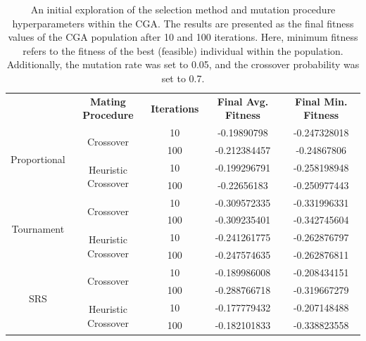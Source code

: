 \documentclass[10pt]{article}
\begin{document}
\begin{table}[H]
    \centering
    \begin{tabular}{|*{5}{c|}}
        \hline
        \renewcommand{\arraystretch}{1.5}
        \multirow{2}{*}{\textbf{Selection Method}} & \multirow{2}{*}{\textbf{Mating Procedure}} & \multirow{2}{*}{\textbf{Iterations}} & \multirow{2}{*}{\textbf{Final Avg. Fitness}} & \multirow{2}{*}{\textbf{Final Min. Fitness}} \\
        & & & & \\
        \hline
        \multirow{4}{*}{Proportional} & \multirow{2}{*}{Crossover} & 10 & -0.19890798 & -0.247328018 \\
        & &\cellcolor{lightgray} 100 &\cellcolor{lightgray} -0.212384457 &\cellcolor{lightgray} -0.24867806 \\
        \cline{2-5}
        & \multirow{2}{*}{Heuristic Crossover} & 10 & -0.199296791 & -0.258198948 \\
        & &\cellcolor{lightgray} 100 &\cellcolor{lightgray} -0.22656183 & \cellcolor{lightgray} -0.250977443 \\
        \hline
        \multirow{4}{*}{Tournament} & \multirow{2}{*}{Crossover} & 10 & -0.309572335 & -0.331996331 \\
        & &\cellcolor{lightgray} 100 &\cellcolor{lightgray} -0.309235401 &\cellcolor{lightgray} -0.342745604 \\
        \cline{2-5}
        & \multirow{2}{*}{Heuristic Crossover} & 10 & -0.241261775 & -0.262876797 \\
        & &\cellcolor{lightgray} 100 &\cellcolor{lightgray} -0.247574635 &\cellcolor{lightgray} -0.262876811 \\
        \hline
        \multirow{4}{*}{SRS} & \multirow{2}{*}{Crossover} & 10 & -0.189986008 & -0.208434151 \\
        & &\cellcolor{lightgray} 100 &\cellcolor{lightgray} -0.288766718 &\cellcolor{lightgray} -0.319667279 \\
        \cline{2-5}
        & \multirow{2}{*}{Heuristic Crossover} & 10 & -0.177779432 & -0.207148488 \\
        & &\cellcolor{lightgray} 100 &\cellcolor{lightgray} -0.182101833 &\cellcolor{lightgray} -0.338823558 \\
        \hline
    \end{tabular}
    \captionsetup{justification=centering}
    \caption{An initial exploration of the selection method and mutation procedure hyperparameters within the CGA. The results are presented as the final fitness values of the CGA population after 10 and 100 iterations. Here, minimum fitness refers to the fitness of the best (feasible) individual within the population. Additionally, the mutation rate was set to 0.05, and the crossover probability was set to 0.7.}
    \label{tab:CGAexploration}
\end{table}
\end{document}
